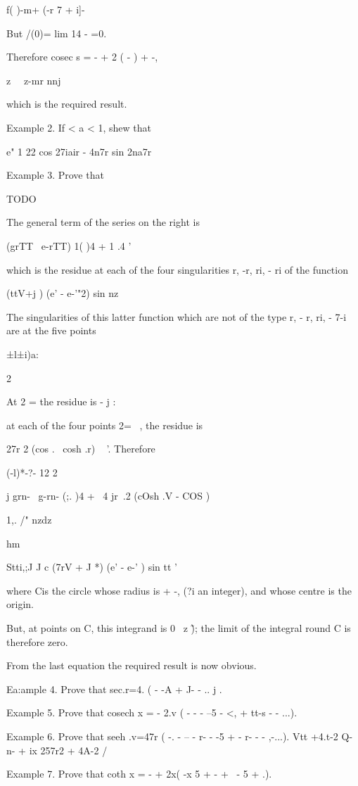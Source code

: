 f( )-m+ (-r 7 + i]-

But /(0)= lim 14 - =0.

Therefore cosec s = - + 2 ( - ) + -,

z \ \ z-mr nnj

which is the required result.

Example 2. If < a < 1, shew that

e" 1 22 cos 27iair - 4n7r sin 2na7r

Example 3. Prove that

TODO

The general term of the series on the right is

(grTT \ e-rTT) 1( )4 + 1 .4 '

which is the residue at each of the four singularities r, -r, ri, - ri
of the function

(ttV+j ) (e' - e-'"2) sin nz

%
%

The singularities of this latter function which are not of the type r,
- r, ri, - 7-i are at the five points

 ±l±i)a:

2

At 2 = the residue is - j :

at each of the four points 2= ~, the residue is

 27r 2 (cos . \ cosh .r) ~ '. Therefore

  (-l)*-?- 12 2

 j grn- \ g-rn- (;. )4 + \ 4 jr\ .2 (cOsh .V - COS )

1,. /" nzdz

hm

Stti,;J J c (7rV + J *) (e' - e-' ) sin tt '

where Cis the circle whose radius is + -, (?i an integer), and whose
centre is the origin.

But, at points on C, this integrand is 0 \ z \~ ); the limit of the
integral round C is therefore zero.

From the last equation the required result is now obvious.

Ea:ample 4. Prove that sec.r=4. ( - -A + J- - .. j .

Example 5. Prove that cosech x = - 2.v ( - - - --5 - <, + tt-s - -
...).

Example 6. Prove that seeh .v=47r ( -. - -- - r- - -5 + - r- - -
,-...). Vtt +4.t-2 Q-n- + ix 257r2 + 4A-2 /

Example 7. Prove that coth x = - + 2x( -x 5 + - + \ - 5 + .).

